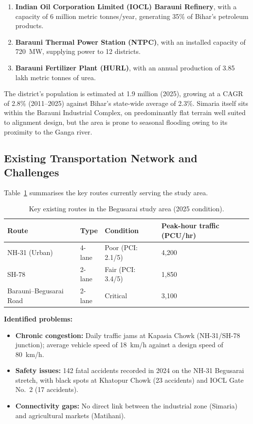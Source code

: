 \documentclass[11pt]{article}
\begin{document}
\begin{enumerate}
  \item \textbf{Indian Oil Corporation Limited (IOCL) Barauni Refinery}, with a capacity of 6 million
  metric tonnes/year, generating 35\% of Bihar's petroleum products.
  \item \textbf{Barauni Thermal Power Station (NTPC)}, with an installed capacity of 720~MW, supplying
  power to 12 districts.
  \item \textbf{Barauni Fertilizer Plant (HURL)}, with an annual production of 3.85 lakh metric tonnes
  of urea.
\end{enumerate}

The district's population is estimated at 1.9 million (2025), growing at a CAGR of 2.8\% (2011--2025)
against Bihar's state-wide average of 2.3\%. Simaria itself sits within the Barauni Industrial Complex,
on predominantly flat terrain well suited to alignment design, but the area is prone to seasonal
flooding owing to its proximity to the Ganga river.

\subsection{Existing Transportation Network and Challenges}
Table~\ref{tab:routes} summarises the key routes currently serving the study area.

\begin{table}[H]
  \centering
  \caption{Key existing routes in the Begusarai study area (2025 condition).}
  \label{tab:routes}
  \begin{tabular}{@{}llll@{}}
    \toprule
    \textbf{Route} & \textbf{Type} & \textbf{Condition} & \textbf{Peak-hour traffic (PCU/hr)} \\
    \midrule
    NH-31 (Urban) & 4-lane & Poor (PCI: 2.1/5) & 4,200 \\
    SH-78 & 2-lane & Fair (PCI: 3.4/5) & 1,850 \\
    Barauni--Begusarai Road & 2-lane & Critical & 3,100 \\
    \bottomrule
  \end{tabular}
\end{table}

\textbf{Identified problems:}
\begin{itemize}
  \item \textbf{Chronic congestion:} Daily traffic jams at Kapasia Chowk (NH-31/SH-78 junction); average
  vehicle speed of 18~km/h against a design speed of 80~km/h.
  \item \textbf{Safety issues:} 142 fatal accidents recorded in 2024 on the NH-31 Begusarai stretch,
  with black spots at Khatopur Chowk (23 accidents) and IOCL Gate No.~2 (17 accidents).
  \item \textbf{Connectivity gaps:} No direct link between the industrial zone (Simaria) and
  agricultural markets (Matihani).
\end{itemize}
\end{document}
